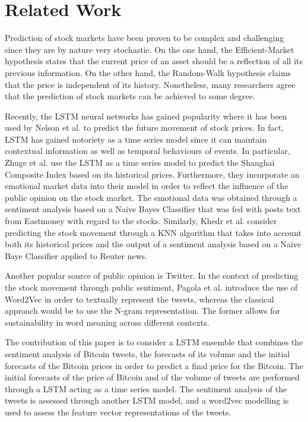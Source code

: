 \documentclass[conference]{IEEEtran}
\begin{document}
\section{Related Work}
\par Prediction of stock markets have been proven to be complex and challenging since they are by nature very stochastic. On the one hand, the Efficient-Market hypothesis states that the current price of an asset should be a reflection of all its previous information. On the other hand, the Random-Walk hypothesis claims that the price is independent of its history. Nonetheless, many researchers agree that the prediction of stock markets can be achieved to some degree.  
\par Recently, the LSTM neural networks has gained popularity where it has been used by Nelson et al. \cite{LSTM Stock} to predict the future movement of stock prices. In fact, LSTM has gained notoriety as a time series model since it can maintain contextual information as well as temporal behaviours of events. In particular, Zhuge et al. \cite{LSTM Emotional} use the LSTM as a time series model to predict the Shanghai Composite Index based on its historical prices. Furthermore, they incorporate an emotional market data into their model in order to reflect the influence of the public opinion on the stock market. The emotional data was obtained through a sentiment analysis based on a Naive Bayes Classifier that was fed with posts text from Eastmoney with regard to the stocks. Similarly, Khedr et al. \cite{Behavior}   consider predicting the stock movement through a KNN algorithm that takes into account both its historical prices and the output of a sentiment analysis based on a Naive Baye Classifier applied to Reuter news. 
\par Another popular source of public opinion is Twitter. In the context of predicting the stock movement through public sentiment, Pagola et al. \cite{word2vec Twitter} introduce the use of Word2Vec in order to textually represent the tweets, whereas the classical approach would be to use the N-gram representation. The former allows for sustainability in word meaning across different contexts.
\par The contribution of this paper is to consider a LSTM ensemble that combines the sentiment analysis of Bitcoin tweets, the forecasts of its volume and the initial forecasts of the Bitcoin prices in order to predict a final price for the Bitcoin. The initial forecasts of the price of Bitcoin and of the volume of tweets are performed through a LSTM acting as a time series model. The sentiment analysis of the tweets is assessed through another LSTM model, and a word2vec modelling is used to assess the feature vector representations of the tweets.
\end{document}

